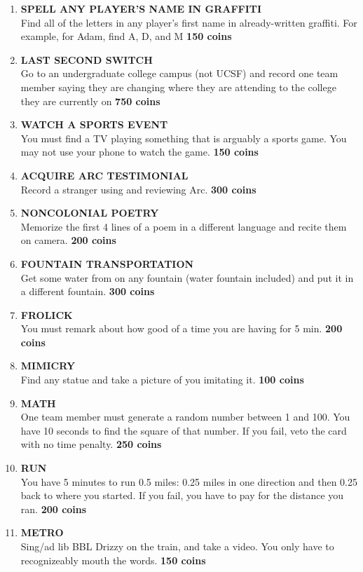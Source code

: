 \documentclass{article}
\begin{document}
\begin{enumerate}
    \item \textbf{SPELL ANY PLAYER'S NAME IN GRAFFITI} \\ Find all of the letters in any player's first name in already-written graffiti. For example, for Adam, find A, D, and M \textbf{150 coins}
    \item \textbf{LAST SECOND SWITCH} \\
    Go to an undergraduate college campus (not UCSF) and record one team member saying they are changing where they are attending to the college they are currently on \textbf{750 coins}
    \item \textbf{WATCH A SPORTS EVENT} \\You must find a TV playing something that is arguably a sports game. You may not use your phone to watch the game. \textbf{150 coins}
    \item \textbf{ACQUIRE ARC TESTIMONIAL} \\  Record a stranger using and reviewing Arc. \textbf{300 coins}
    \item \textbf{NONCOLONIAL POETRY} \\ Memorize the first 4 lines of a poem in a different language and recite them on camera. \textbf{200 coins}
    \item \textbf{FOUNTAIN TRANSPORTATION} \\Get some water from on any fountain (water fountain included) and put it in a different fountain. \textbf{300 coins}
    \item \textbf{FROLICK} \\ You must remark about how good of a time you are having for 5 min. \textbf{200 coins}
    \item \textbf{MIMICRY}\\ Find any statue and take a picture of you imitating it. \textbf{100 coins}
    \item \textbf{MATH} \\ One team member must generate a random number between 1 and 100. You have 10 seconds to find the square of that number. If you fail, veto the card with no time penalty. \textbf{250 coins}
    \item \textbf{RUN}\\ You have 5 minutes to run 0.5 miles: 0.25 miles in one direction and then 0.25 back to where you started. If you fail, you have to pay for the distance you ran. \textbf{200 coins}
    \item \textbf{METRO} \\ Sing/ad lib BBL Drizzy on the train, and take a video. You only have to recognizeably mouth the words. \textbf{150 coins}

\end{enumerate}
\end{document}

